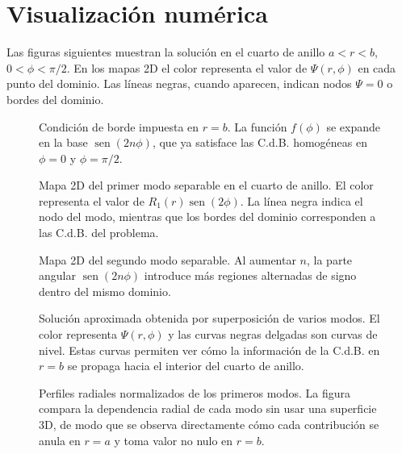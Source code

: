 \documentclass[11pt]{article}
\newcommand{\sen}{\operatorname{sen}}
\begin{document}
\section*{Visualización numérica}

Las figuras siguientes muestran la solución en el cuarto de anillo $a<r<b$, $0<\phi<\pi/2$. En los mapas 2D el color representa el valor de $\Psi(r,\phi)$ en cada punto del dominio. Las líneas negras, cuando aparecen, indican nodos $\Psi=0$ o bordes del dominio.

\begin{figure}[h]
\centering

\caption{Condición de borde impuesta en $r=b$. La función $f(\phi)$ se expande en la base $\sen(2n\phi)$, que ya satisface las C.d.B. homogéneas en $\phi=0$ y $\phi=\pi/2$.}
\end{figure}

\begin{figure}[h]
\centering

\caption{Mapa 2D del primer modo separable en el cuarto de anillo. El color representa el valor de $R_1(r)\sen(2\phi)$. La línea negra indica el nodo del modo, mientras que los bordes del dominio corresponden a las C.d.B. del problema.}
\end{figure}

\begin{figure}[h]
\centering

\caption{Mapa 2D del segundo modo separable. Al aumentar $n$, la parte angular $\sen(2n\phi)$ introduce más regiones alternadas de signo dentro del mismo dominio.}
\end{figure}

\begin{figure}[h]
\centering

\caption{Solución aproximada obtenida por superposición de varios modos. El color representa $\Psi(r,\phi)$ y las curvas negras delgadas son curvas de nivel. Estas curvas permiten ver cómo la información de la C.d.B. en $r=b$ se propaga hacia el interior del cuarto de anillo.}
\end{figure}

\begin{figure}[h]
\centering

\caption{Perfiles radiales normalizados de los primeros modos. La figura compara la dependencia radial de cada modo sin usar una superficie 3D, de modo que se observa directamente cómo cada contribución se anula en $r=a$ y toma valor no nulo en $r=b$.}
\end{figure}
\end{document}
